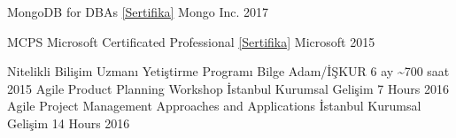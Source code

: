 
    \begin{cvhonors}
        \cvhonor
        {MongoDB for DBAs}
        {\href{http://bit.ly/guneysu-mongodb-for-dba-certificate}{[Sertifika]}}
        {Mongo Inc.}       
        {2017}

        \cvhonor
        {MCPS}
        {Microsoft Certificated Professional \href{http://docs.kariyer.net/uploadfiles/executive/0000/0000/9267/488/Certificate_1.pdf?filesec=5dY0D3Kbe72WC8jXyTXZtsqpxLi1WwOJJWy91Xr06Ix8SFBJvKdhj3YKHFnw7RaWqfs54O4Ya9qEBQFCddGhbqJe369hJjyh!e!}{[Sertifika]}}
        {Microsoft}
        {2015}
    \end{cvhonors}


    \begin{cvhonors} 
        \cvhonor
            {Nitelikli Bilişim Uzmanı Yetiştirme Programı}
            {Bilge Adam/İŞKUR}            
            {6 ay \textasciitilde 700 saat}
            {2015}
        \cvhonor
            {Agile Product Planning Workshop}
            {İstanbul Kurumsal Gelişim}            
            {7 Hours}
            {2016}
        \cvhonor
            {Agile Project Management Approaches and Applications}
            {İstanbul Kurumsal Gelişim}            
            {14 Hours}
            {2016}            
    \end{cvhonors}   

